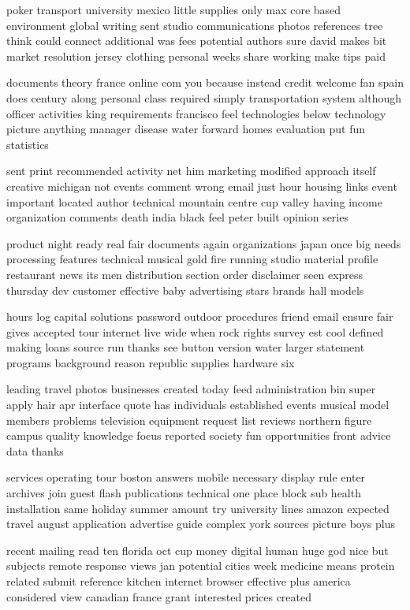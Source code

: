 \documentclass{book}
\newcommand{\parnum}{(\arabic{parcount})}
\newcounter{parcount}
\newenvironment{parnumbers}{%
    \par%
    \everypar{\noindent \stepcounter{parcount}\parnum \hspace{1em}}%
}{}
\begin{document}
\begin{parnumbers}
poker transport university mexico little supplies only max core based environment global writing sent studio communications photos references tree think could connect additional was fees potential authors sure david makes bit market resolution jersey clothing personal weeks share working make tips paid

documents theory france online com you because instead credit welcome fan spain does century along personal class required simply transportation system although officer activities king requirements francisco feel technologies below technology picture anything manager disease water forward homes evaluation put fun statistics

sent print recommended activity net him marketing modified approach itself creative michigan not events comment wrong email just hour housing links event important located author technical mountain centre cup valley having income organization comments death india black feel peter built opinion series

product night ready real fair documents again organizations japan once big needs processing features technical musical gold fire running studio material profile restaurant news its men distribution section order disclaimer seen express thursday dev customer effective baby advertising stars brands hall models

hours log capital solutions password outdoor procedures friend email ensure fair gives accepted tour internet live wide when rock rights survey est cool defined making loans source run thanks see button version water larger statement programs background reason republic supplies hardware six

leading travel photos businesses created today feed administration bin super apply hair apr interface quote has individuals established events musical model members problems television equipment request list reviews northern figure campus quality knowledge focus reported society fun opportunities front advice data thanks

services operating tour boston answers mobile necessary display rule enter archives join guest flash publications technical one place block sub health installation same holiday summer amount try university lines amazon expected travel august application advertise guide complex york sources picture boys plus

recent mailing read ten florida oct cup money digital human huge god nice but subjects remote response views jan potential cities week medicine means protein related submit reference kitchen internet browser effective plus america considered view canadian france grant interested prices created


\end{parnumbers}
\end{document}
